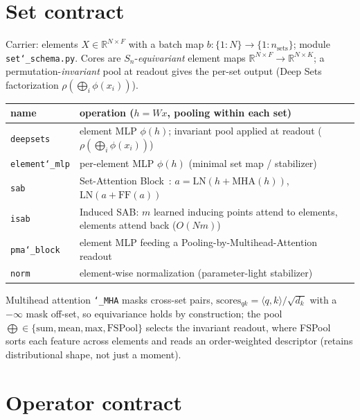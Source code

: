 \documentclass[11pt]{article}
\newcommand{\allowbreakhere}{\discretionary{}{}{}}
\newcommand{\code}[1]{\texttt{\def\_{\char`_\allowbreakhere}#1}}
\newcommand{\R}{\mathbb{R}}
\newcommand{\Sn}{S_n}
\begin{document}
\section{Set contract}
\label{sec:set}

Carrier: elements $X\in\R^{N\times F}$ with a batch map $b:\{1{:}N\}\to\{1{:}n_{\mathrm{sets}}\}$; module
\code{set\_schema.py}. Cores are $\Sn$-\emph{equivariant} element maps $\R^{N\times F}\!\to\!\R^{N\times K}$;
a permutation-\emph{invariant} pool at readout gives the per-set output (Deep Sets~\cite{zaheer2017deepsets} factorization
$\rho(\bigoplus_i\phi(x_i))$).

\begin{center}
\footnotesize
\renewcommand{\arraystretch}{1.35}
\begin{tabular}{@{}p{1.9cm}p{11.0cm}@{}}
\toprule name & operation ($h=Wx$, pooling within each set)\\
\midrule
\code{deepsets}    & element MLP $\phi(h)$; invariant pool applied at readout ($\rho(\bigoplus_i\phi(x_i))$)\\
\code{element\_mlp}& per-element MLP $\phi(h)$ (minimal set map / stabilizer)\\
\code{sab}         & Set-Attention Block~\cite{lee2019settransformer}: $a=\mathrm{LN}(h+\mathrm{MHA}(h))$, $\mathrm{LN}(a+\mathrm{FF}(a))$\\
\code{isab}        & Induced SAB: $m$ learned inducing points attend to elements, elements attend back ($O(Nm)$)\\
\code{pma\_block}  & element MLP feeding a Pooling-by-Multihead-Attention readout\\
\code{norm}        & element-wise normalization (parameter-light stabilizer)\\
\bottomrule
\end{tabular}
\end{center}

\noindent Multihead attention \code{\_MHA} masks cross-set pairs, $\text{scores}_{qk}=\langle q,k\rangle/\sqrt{d_k}$
with a $-\infty$ mask off-set, so equivariance holds by construction; the pool
$\bigoplus\in\{\text{sum},\text{mean},\text{max},\text{FSPool}\}$ selects the invariant readout, where
FSPool~\cite{zhang2020fspool} sorts each feature across elements and reads an order-weighted descriptor (retains distributional
shape, not just a moment).

\section{Operator contract}
\label{sec:operator}
\end{document}

